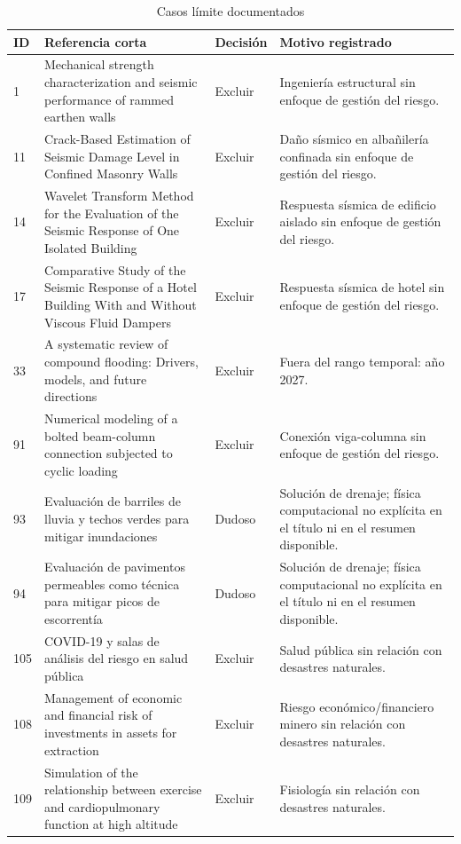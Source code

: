 \documentclass[12pt,a4paper]{article}
\begin{document}
\begin{table}[H]
  \centering
  \caption{Casos límite documentados}
  \label{tab:casos-limite}
  \scriptsize
  \begin{tabularx}{\textwidth}{@{}p{0.6cm}>{\raggedright\arraybackslash}X>{\centering\arraybackslash}p{1.35cm}>{\raggedright\arraybackslash}X@{}}
    \toprule
    ID & Referencia corta & Decisión & Motivo registrado \\
    \midrule
    1 & Mechanical strength characterization and seismic performance of rammed earthen walls & Excluir & Ingeniería estructural sin enfoque de gestión del riesgo. \\
    11 & Crack-Based Estimation of Seismic Damage Level in Confined Masonry Walls & Excluir & Daño sísmico en albañilería confinada sin enfoque de gestión del riesgo. \\
    14 & Wavelet Transform Method for the Evaluation of the Seismic Response of One Isolated Building & Excluir & Respuesta sísmica de edificio aislado sin enfoque de gestión del riesgo. \\
    17 & Comparative Study of the Seismic Response of a Hotel Building With and Without Viscous Fluid Dampers & Excluir & Respuesta sísmica de hotel sin enfoque de gestión del riesgo. \\
    33 & A systematic review of compound flooding: Drivers, models, and future directions & Excluir & Fuera del rango temporal: año 2027. \\
    91 & Numerical modeling of a bolted beam-column connection subjected to cyclic loading & Excluir & Conexión viga-columna sin enfoque de gestión del riesgo. \\
    93 & Evaluación de barriles de lluvia y techos verdes para mitigar inundaciones & Dudoso & Solución de drenaje; física computacional no explícita en el título ni en el resumen disponible. \\
    94 & Evaluación de pavimentos permeables como técnica para mitigar picos de escorrentía & Dudoso & Solución de drenaje; física computacional no explícita en el título ni en el resumen disponible. \\
    105 & COVID-19 y salas de análisis del riesgo en salud pública & Excluir & Salud pública sin relación con desastres naturales. \\
    108 & Management of economic and financial risk of investments in assets for extraction & Excluir & Riesgo económico/financiero minero sin relación con desastres naturales. \\
    109 & Simulation of the relationship between exercise and cardiopulmonary function at high altitude & Excluir & Fisiología sin relación con desastres naturales. \\
    \bottomrule
  \end{tabularx}
\end{table}
\end{document}
